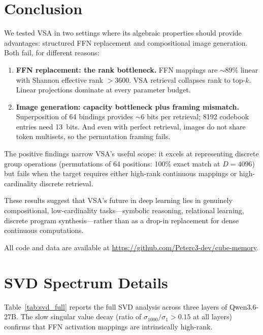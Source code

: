 \documentclass{article}
\begin{document}
\section{Conclusion}
\label{sec:conclusion}

We tested VSA in two settings where its algebraic properties should provide advantages: structured FFN replacement and compositional image generation.
Both fail, for different reasons:

\begin{enumerate}[leftmargin=*]
\item \textbf{FFN replacement: the rank bottleneck.} FFN mappings are ${\sim}89\%$ linear with Shannon effective rank ${>}3600$. VSA retrieval collapses rank to top-$k$. Linear projections dominate at every parameter budget.
\item \textbf{Image generation: capacity bottleneck plus framing mismatch.} Superposition of 64 bindings provides ${\sim}6$ bits per retrieval; 8192 codebook entries need 13~bits. And even with perfect retrieval, images do not share token multisets, so the permutation framing fails.
\end{enumerate}

The positive findings narrow VSA's useful scope: it excels at representing discrete group operations (permutations of 64 positions: 100\% exact match at $D{=}4096$) but fails when the target requires either high-rank continuous mappings or high-cardinality discrete retrieval.

These results suggest that VSA's future in deep learning lies in genuinely compositional, low-cardinality tasks---symbolic reasoning, relational learning, discrete program synthesis---rather than as a drop-in replacement for dense continuous computations.

All code and data are available at \url{https://github.com/Peterc3-dev/cube-memory}.



\appendix

\section{SVD Spectrum Details}
\label{app:svd}

Table~\ref{tab:svd_full} reports the full SVD analysis across three layers of Qwen3.6-27B.
The slow singular value decay (ratio of $\sigma_{1000}/\sigma_1 > 0.15$ at all layers) confirms that FFN activation mappings are intrinsically high-rank.
\end{document}
